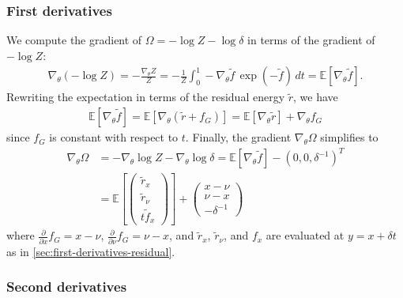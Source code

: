 \documentclass{article}
\begin{document}
\subsubsection{First derivatives}\label{sec:qrician-first-derivatives}

We compute the gradient of $\Omega = -\log Z - \log\delta$ in terms of the gradient of $-\log Z$:
%
\begin{align}
  \nabla_{\theta} (-\log Z) = -\frac{\nabla_{\theta} Z}{Z} = -\frac{1}{Z}\int_0^1 -\nabla_{\theta} \tilde{f} \, \exp(-\tilde{f}) \, dt = \mathbb{E}[\nabla_{\theta} \tilde{f}].
\end{align}
%
Rewriting the expectation in terms of the residual energy $\tilde{r}$, we have
%
\begin{align}
  \mathbb{E}[\nabla_{\theta} \tilde{f}] = \mathbb{E}[\nabla_{\theta} (\tilde{r} + f_G)] = \mathbb{E}[\nabla_{\theta} \tilde{r}] + \nabla_{\theta} f_G
\end{align}
%
since $f_G$ is constant with respect to $t$.
Finally, the gradient $\nabla_{\theta} \Omega$ simplifies to
%
\begin{align}
  \nabla_{\theta} \Omega & = - \nabla_\theta \log Z - \nabla_\theta \log\delta = \mathbb{E}[\nabla_{\theta} \tilde{f}] - (0, 0, \delta^{-1})^T \\
                         & = \mathbb{E}\left[ \begin{pmatrix} \tilde{r}_x \\ \tilde{r}_\nu \\ t \tilde{f}_x \end{pmatrix} \right]
  + \begin{pmatrix} x - \nu \\ \nu - x \\ -\delta^{-1} \end{pmatrix}
\end{align}
%
where $\frac{\partial}{\partial x} f_G = x - \nu$, $\frac{\partial}{\partial \nu} f_G = \nu - x$, and $\tilde{r}_x$, $\tilde{r}_\nu$, and $f_x$ are evaluated at $y=x + \delta t$ as in \cref{sec:first-derivatives-residual}.

\subsubsection{Second derivatives}\label{sec:qrician-second-derivatives}
\end{document}
